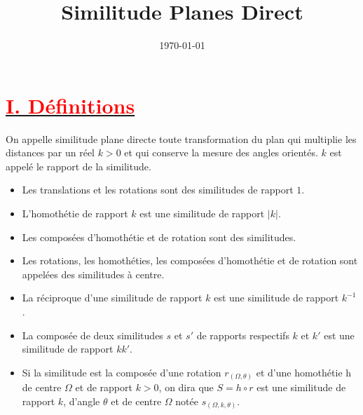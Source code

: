 \documentclass[12pt]{article}
\title{\textbf{Similitude Planes Direct}}
\date{\today}
\begin{document}
\maketitle
\newpage
\section*{\underline{\textbf{\textcolor{red}{I. Définitions}}}}
On appelle similitude plane directe toute transformation du plan qui multiplie les distances par un réel $k > 0$ et qui conserve la mesure des angles orientés. $k$ est appelé le rapport de la similitude.
\begin{itemize}
    \item Les translations et les rotations sont des similitudes de rapport $1$.
    \item L'homothétie de rapport $k$ est une similitude de rapport $|k|$.
    \item Les composées d'homothétie et de rotation sont des similitudes.
    \item Les rotations, les homothéties, les composées d'homothétie et de rotation sont appelées des similitudes à centre.
    \item La réciproque d'une similitude de rapport $k$ est une similitude de rapport $k^{-1}$.
    \item La composée de deux similitudes $s$ et $s'$ de rapports respectifs $k$ et $k'$ est une similitude de rapport $kk'$.
    \item Si la similitude est la composée d'une rotation $r_{(\Omega,\theta)}$ et d'une homothétie h de centre $\Omega$ et de rapport $k > 0$, on dira que $S = h \circ r$ est une similitude de rapport $k$, d'angle $\theta$ et de centre $\Omega$ notée $s_{(\Omega,k,\theta)}$.
\end{itemize}
\end{document}

